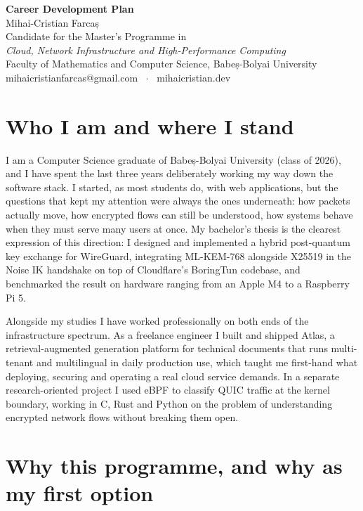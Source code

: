 \documentclass[11pt,a4paper]{article}
\begin{document}
\begin{center}
    {\LARGE \textbf{Career Development Plan}} \\ \vspace{0.4em}
    {\large Mihai-Cristian Farcaș} \\ \vspace{0.2em}
    Candidate for the Master's Programme in \\
    \emph{Cloud, Network Infrastructure and High-Performance Computing} \\
    Faculty of Mathematics and Computer Science, Babeș-Bolyai University \\ \vspace{0.2em}
    mihaicristianfarcas@gmail.com \ $\cdot$ \ mihaicristian.dev
\end{center}

\section*{Who I am and where I stand}

I am a Computer Science graduate of Babeș-Bolyai University (class of 2026), and I have spent the last three years deliberately working my way down the software stack. I started, as most students do, with web applications, but the questions that kept my attention were always the ones underneath: how packets actually move, how encrypted flows can still be understood, how systems behave when they must serve many users at once. My bachelor's thesis is the clearest expression of this direction: I designed and implemented a hybrid post-quantum key exchange for WireGuard, integrating ML-KEM-768 alongside X25519 in the Noise IK handshake on top of Cloudflare's BoringTun codebase, and benchmarked the result on hardware ranging from an Apple M4 to a Raspberry Pi 5.

Alongside my studies I have worked professionally on both ends of the infrastructure spectrum. As a freelance engineer I built and shipped Atlas, a retrieval-augmented generation platform for technical documents that runs multi-tenant and multilingual in daily production use, which taught me first-hand what deploying, securing and operating a real cloud service demands. In a separate research-oriented project I used eBPF to classify QUIC traffic at the kernel boundary, working in C, Rust and Python on the problem of understanding encrypted network flows without breaking them open.

\section*{Why this programme, and why as my first option}
\end{document}
